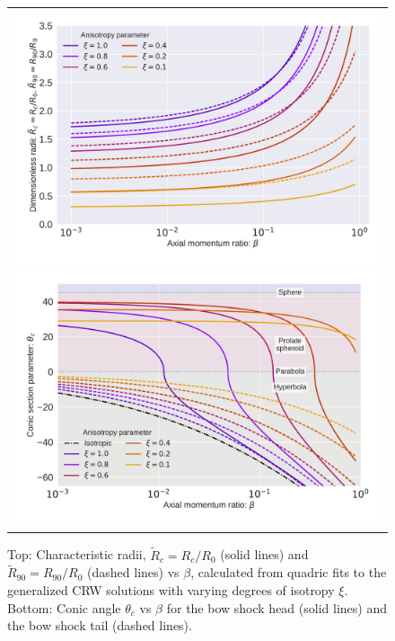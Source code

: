 \begin{figure}
\begin{tabular}{c}
\includegraphics[width=\linewidth]{figs/AB-beta-log} \\
\includegraphics[width=\linewidth]{figs/thc-beta-log}
\end{tabular}
\caption{Top: Characteristic radii, $\tilde{R}_c = R_c/R_0$ (solid lines) and $\tilde{R}_{90}
  = R_{90}/R_0$ (dashed lines)
  vs $\beta$, calculated from quadric fits to the generalized CRW
  solutions with varying degrees of isotropy $\xi$.  Bottom: Conic
  angle $\theta_c$ vs $\beta$ for the bow 
  shock head (solid lines) and the bow shock tail (dashed lines).}
\label{fig:rad-beta}
\end{figure}



